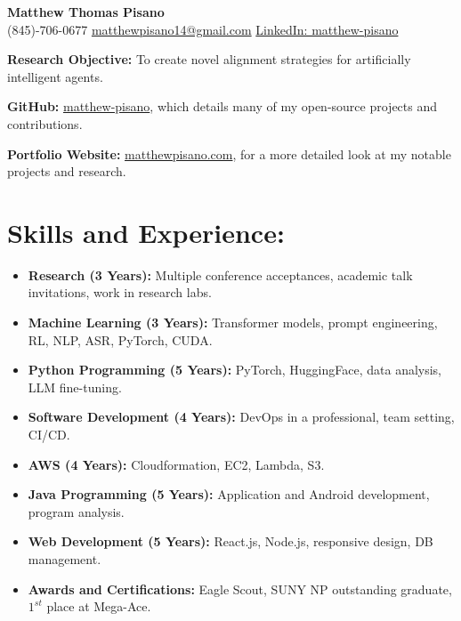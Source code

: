\documentclass[12pt]{article}
\title{}
\author{\textbf{\LARGE Matthew Thomas Pisano}}
\date{}
\begin{document}
\pagestyle{plain}

\begin{tcolorbox}[width=\linewidth, sharp corners=all, colback=white!90!green, colframe=black]
    
    \begin{center}
        \textbf{\LARGE Matthew Thomas Pisano}\\
        \vspace{0.1in}
        (845)-706-0677 \hspace*{0.3in}
        \href{mailto:matthewpisano14@gmail.com}{matthewpisano14@gmail.com} \hspace*{0.5in}
        \href{https://www.linkedin.com/in/matthew-pisano/}{LinkedIn: matthew-pisano}
    \end{center}
    
\end{tcolorbox}

\vspace{0.1in}

\hspace*{-0.3in}
\textbf{Research Objective:} To create novel alignment strategies for artificially intelligent agents.

\vspace{0.1in}

\hspace*{-0.3in}
\textbf{GitHub:} \href{https://github.com/matthew-pisano}{matthew-pisano}, which details many of my open-source projects and contributions.

\hspace*{-0.3in}
\textbf{Portfolio Website:} \href{https://matthewpisano.com}{matthewpisano.com}, for a more detailed look at my notable projects and research.

\section*{Skills and Experience:}
\begin{itemize}
    \itemsep0em
    \item \textbf{Research (3 Years):} Multiple conference acceptances, academic talk invitations, work in research labs.
    \item \textbf{Machine Learning (3 Years):} Transformer models, prompt engineering, RL, NLP, ASR, PyTorch, CUDA.
    \item \textbf{Python Programming (5 Years):} PyTorch, HuggingFace, data analysis, LLM fine-tuning.
    \item \textbf{Software Development (4 Years):} DevOps in a professional, team setting, CI/CD. 
    \item \textbf{AWS (4 Years):} Cloudformation, EC2, Lambda, S3.
    \item \textbf{Java Programming (5 Years):} Application and Android development, program analysis.
    \item \textbf{Web Development (5 Years):} React.js, Node.js, responsive design, DB management.
    \item \textbf{Awards and Certifications:} Eagle Scout, SUNY NP outstanding graduate, $1^{st}$ place at Mega-Ace.
\end{itemize}
\end{document}
